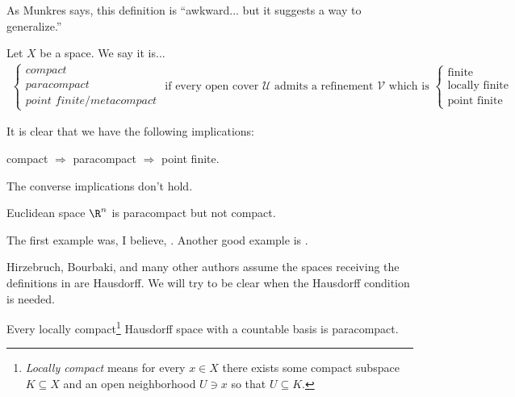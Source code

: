 \documentclass[11pt]{book}
\begin{document}
As Munkres says, this definition is ``awkward... but it suggests a way to generalize.''

\begin{definition}\label{def:compact-paracompact-point-finite} Let $X$ be a space. We say it is...
\begin{align*}
    \begin{cases} \textit{compact} \\ \textit{paracompact} \\ \textit{point finite/metacompact}\end{cases}\text{ if every open cover }\mathcal{U}\text{ admits a refinement }\mathcal{V}\text{ which is }
    \begin{cases} \text{finite} \\ \text{locally finite} \\ \text{point finite}\end{cases}
\end{align*}
\end{definition}
It is clear that we have the following implications:
\begin{center}
    compact $\Rightarrow$ paracompact $\Rightarrow$ point finite.
\end{center}

The converse implications don't hold.

\begin{example} Euclidean space $\R^n$ is paracompact but not compact.
\end{example}

\begin{example} The first example was, I believe, \cite[Example~B]{bingMetrizationTopologicalSpaces1951}. Another good example is \cite[Example~89]{steeinCounterexamplesTopology1978}.
\end{example}

\begin{remark} Hirzebruch, Bourbaki, and many other authors assume the spaces receiving the definitions in  are Hausdorff. We will try to be clear when the Hausdorff condition is needed.
\end{remark}

\begin{theorem} Every locally compact\footnote{\emph{Locally compact} means for every $x\in X$ there exists some compact subspace $K \subseteq X$ and an open neighborhood $U\ni x$ so that $U \subseteq K$.} Hausdorff space with a countable basis is paracompact.
\end{theorem}
\end{document}
